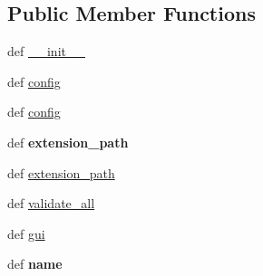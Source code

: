 \subsection*{Public Member Functions}
\begin{DoxyCompactItemize}
\item 
def \hyperlink{classcommotion__client_1_1utils_1_1validate_1_1ClientConfig_a1cf31ea11ff5dc7f47fcd62f16ab81f8}{\-\_\-\-\_\-init\-\_\-\-\_\-}
\item 
def \hyperlink{classcommotion__client_1_1utils_1_1validate_1_1ClientConfig_ad835c01a4478e52d1d4042e7230b0c61}{config}
\item 
def \hyperlink{classcommotion__client_1_1utils_1_1validate_1_1ClientConfig_ad835c01a4478e52d1d4042e7230b0c61}{config}
\item 
\hypertarget{classcommotion__client_1_1utils_1_1validate_1_1ClientConfig_a7e66cdad22581943cee6dae41cd5b84f}{def {\bfseries extension\-\_\-path}}\label{classcommotion__client_1_1utils_1_1validate_1_1ClientConfig_a7e66cdad22581943cee6dae41cd5b84f}

\item 
def \hyperlink{classcommotion__client_1_1utils_1_1validate_1_1ClientConfig_a7e66cdad22581943cee6dae41cd5b84f}{extension\-\_\-path}
\item 
def \hyperlink{classcommotion__client_1_1utils_1_1validate_1_1ClientConfig_ae1cfca31202df7ad46ca996cf9b38b3d}{validate\-\_\-all}
\item 
def \hyperlink{classcommotion__client_1_1utils_1_1validate_1_1ClientConfig_aa3a463fc48d9d7d219356d6150b4630f}{gui}
\item 
\hypertarget{classcommotion__client_1_1utils_1_1validate_1_1ClientConfig_ab92a3ae4cc66c3141e643792d05cab3c}{def {\bfseries name}}\label{classcommotion__client_1_1utils_1_1validate_1_1ClientConfig_ab92a3ae4cc66c3141e643792d05cab3c}


\end{DoxyCompactItemize}
